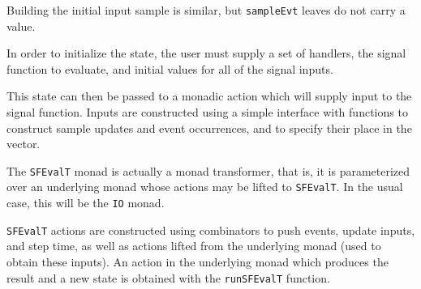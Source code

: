 Building the initial input sample is similar, but {\tt sampleEvt} leaves do
not carry a value.

In order to initialize the state, the user must supply a set of handlers, the
signal function to evaluate, and initial values for all of the signal inputs.

This state can then be passed to a monadic action which will supply input to
the signal function. Inputs are constructed using a simple interface with
functions to construct sample updates and event occurrences, and to specify
their place in the vector.

The {\tt SFEvalT} monad is actually a monad transformer, that is, it is
parameterized over an underlying monad whose actions may be lifted to
{\tt SFEvalT}. In the usual case, this will be the {\tt IO} monad.

{\tt SFEvalT} actions are constructed using combinators to push events,
update inputs, and step time, as well as actions lifted from the underlying
monad (used to obtain these inputs). An action in the underlying monad
which produces the result and a new state is obtained with the {\tt runSFEvalT}
function.
